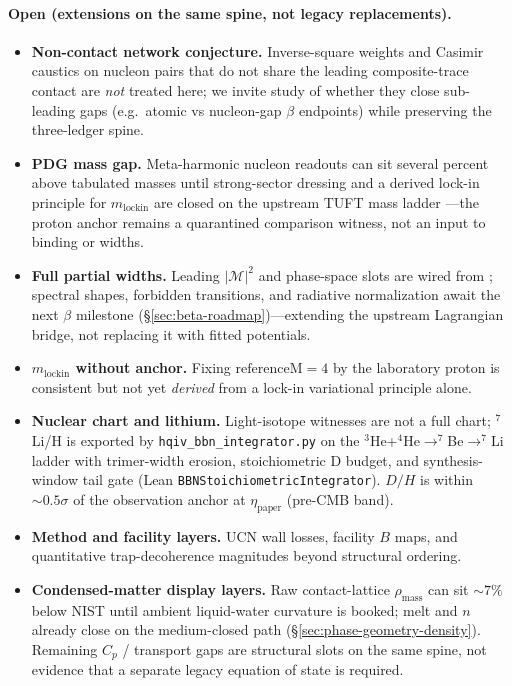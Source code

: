 \documentclass[11pt,notitlepage]{amsart}
\begin{document}
\paragraph{Open (extensions on the same spine, not legacy replacements).}
\begin{itemize}[leftmargin=2em]
\item \textbf{Non-contact network conjecture.} Inverse-square weights and Casimir
  caustics on nucleon pairs that do not share the leading composite-trace contact are
  \emph{not} treated here; we invite study of whether they close sub-leading gaps
  (e.g.\ atomic vs nucleon-gap $\beta$ endpoints) while preserving the three-ledger spine.
\item \textbf{PDG mass gap.} Meta-harmonic nucleon readouts can sit several percent
  above tabulated masses until strong-sector dressing and a derived lock-in principle
  for $m_{\mathrm{lockin}}$ are closed on the upstream TUFT mass ladder
  \cite{hqiv-tuft-sm-lagrangian-paper}---the proton anchor remains a quarantined
  comparison witness, not an input to binding or widths.
\item \textbf{Full partial widths.} Leading $|\mathcal{M}|^2$ and phase-space slots
  are wired from \cite{hqiv-tuft-sm-lagrangian-paper}; spectral shapes, forbidden
  transitions, and radiative normalization await the next $\beta$ milestone
  (\S\ref{sec:beta-roadmap})---extending the upstream Lagrangian bridge, not replacing
  it with fitted potentials.
\item \textbf{$m_{\mathrm{lockin}}$ without anchor.} Fixing $\mathrm{referenceM}=4$ by
  the laboratory proton is consistent but not yet \emph{derived} from a lock-in
  variational principle alone.
\item \textbf{Nuclear chart and lithium.} Light-isotope witnesses are not a full
  chart; $^7$Li/H is exported by \texttt{hqiv\_bbn\_integrator.py} on the
  $^3$He+$^4$He$\to^7$Be$\to^7$Li ladder with trimer-width erosion,
  stoichiometric D budget, and synthesis-window tail gate (Lean
  \texttt{BBNStoichiometricIntegrator}).
  $D/H$ is within $\sim 0.5\sigma$ of the observation anchor at $\eta_{\mathrm{paper}}$
  (pre-CMB band).
\item \textbf{Method and facility layers.} UCN wall losses, facility $B$ maps, and
  quantitative trap-decoherence magnitudes beyond structural ordering.
\item \textbf{Condensed-matter display layers.} Raw contact-lattice $\rho_{\mathrm{mass}}$
  can sit $\sim 7\%$ below NIST until ambient liquid-water curvature is booked; melt and
  $n$ already close on the medium-closed path (\S\ref{sec:phase-geometry-density}).
  Remaining $C_p$ / transport gaps are structural slots on the same spine, not evidence
  that a separate legacy equation of state is required.
\end{itemize}
\end{document}
